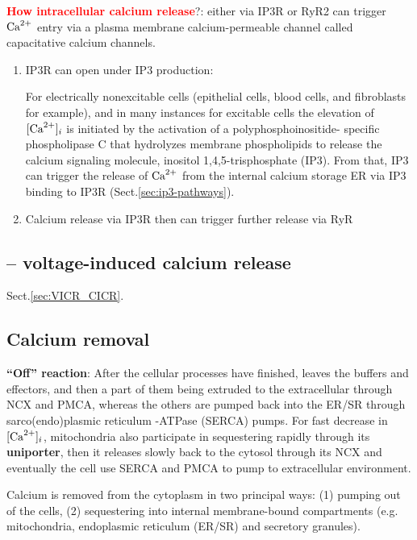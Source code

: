 \textcolor{red}{\bf How intracellular calcium release}?: either via IP3R or
RyR2 can trigger ${\text{Ca}^{2+}}$ entry via a plasma membrane calcium-permeable channel
called capacitative calcium channels.
\begin{enumerate}
  \item IP3R can open under IP3 production:

For electrically nonexcitable cells (epithelial cells, blood cells, and
fibroblasts for example), and in many instances for excitable cells the
elevation of $[{\text{Ca}^{2+}}]_i$ is initiated by the activation of a polyphosphoinositide-
specific phospholipase C that hydrolyzes membrane phospholipids to release the
calcium signaling molecule, inositol 1,4,5-trisphosphate (IP3).
From that, IP3 can trigger the release of ${\text{Ca}^{2+}}$ from the internal calcium
storage ER via IP3 binding to IP3R (Sect.\ref{sec:ip3-pathways}).
  
  \item Calcium release via IP3R then can trigger further release via RyR
\end{enumerate}




\subsection{-- voltage-induced calcium release}

Sect.\ref{sec:VICR_CICR}.


\subsection{Calcium removal}

{\bf ``Off'' reaction}: After the cellular processes have finished, 
leaves the buffers and effectors, and then a part of them being extruded to the
extracellular through NCX and PMCA, whereas the others are pumped back into the
ER/SR through sarco(endo)plasmic reticulum -ATPase (SERCA) pumps. For
fast decrease in $[\ce{Ca^2+}]_i$, mitochondria also participate in sequestering
 rapidly through its {\bf uniporter}, then it releases slowly
 back to the cytosol through its NCX and eventually the cell use SERCA
and PMCA to pump to extracellular environment.

Calcium is removed from the cytoplasm in two principal ways: (1)
pumping out of the cells, (2) sequestering into internal
membrane-bound compartments (e.g. mitochondria, endoplasmic reticulum
(ER/SR) and secretory granules).  



